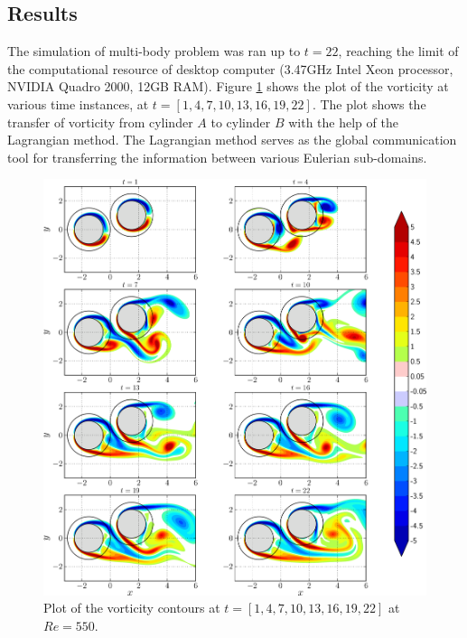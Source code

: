 \subsection{Results}

The simulation of multi-body problem was ran up to $t=22$, reaching the limit of the computational resource of desktop computer (3.47GHz Intel Xeon processor, NVIDIA Quadro 2000, 12GB RAM). Figure \ref{fig:hybrid_multipleCylinder_contours_compressed-crop} shows the plot of the vorticity at various time instances, at $t=[1,4,7,10,13,16,19,22]$. The plot shows the transfer of vorticity from cylinder $A$ to cylinder $B$ with the help of the Lagrangian method. The Lagrangian method serves as the global communication tool for transferring the information between various Eulerian sub-domains. 

	\begin{figure}[H]
	\centering
	\includegraphics[width=\linewidth]{./figures/validation/multipleCylinder/hybrid_multipleCylinder_contours_compressed-crop.png}
	\caption{Plot of the vorticity contours at $t=[1,4,7,10,13,16,19,22]$ at $Re=550$.}
	\label{fig:hybrid_multipleCylinder_contours_compressed-crop}
	\end{figure}

